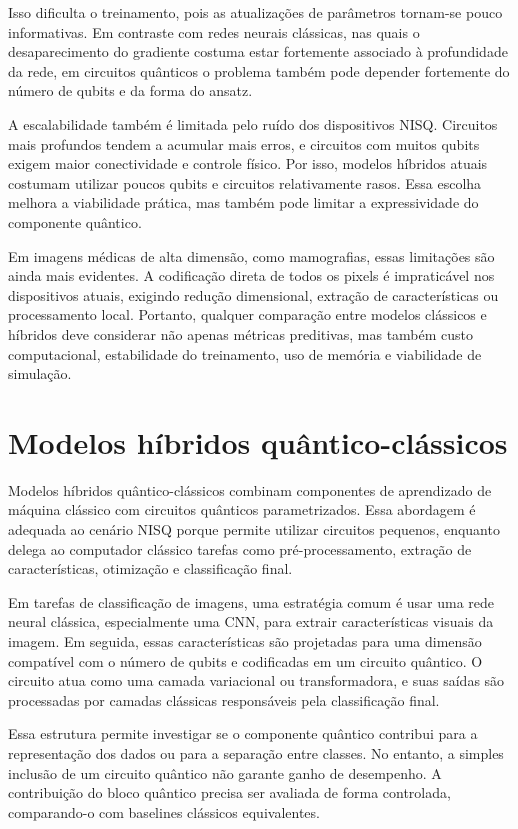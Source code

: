 \documentclass[
    12pt,
    openright,
    oneside,
    a4paper,
    english,
    brazil
]{abntex2}
\begin{document}
Isso dificulta o treinamento, pois as atualizações de parâmetros tornam-se pouco informativas. Em contraste com redes neurais clássicas, nas quais o desaparecimento do gradiente costuma estar fortemente associado à profundidade da rede, em circuitos quânticos o problema também pode depender fortemente do número de qubits e da forma do ansatz.

A escalabilidade também é limitada pelo ruído dos dispositivos NISQ. Circuitos mais profundos tendem a acumular mais erros, e circuitos com muitos qubits exigem maior conectividade e controle físico. Por isso, modelos híbridos atuais costumam utilizar poucos qubits e circuitos relativamente rasos. Essa escolha melhora a viabilidade prática, mas também pode limitar a expressividade do componente quântico.

Em imagens médicas de alta dimensão, como mamografias, essas limitações são ainda mais evidentes. A codificação direta de todos os pixels é impraticável nos dispositivos atuais, exigindo redução dimensional, extração de características ou processamento local. Portanto, qualquer comparação entre modelos clássicos e híbridos deve considerar não apenas métricas preditivas, mas também custo computacional, estabilidade do treinamento, uso de memória e viabilidade de simulação.


\section{Modelos híbridos quântico-clássicos}

Modelos híbridos quântico-clássicos combinam componentes de aprendizado de máquina clássico com circuitos quânticos parametrizados. Essa abordagem é adequada ao cenário NISQ porque permite utilizar circuitos pequenos, enquanto delega ao computador clássico tarefas como pré-processamento, extração de características, otimização e classificação final.

Em tarefas de classificação de imagens, uma estratégia comum é usar uma rede neural clássica, especialmente uma CNN, para extrair características visuais da imagem. Em seguida, essas características são projetadas para uma dimensão compatível com o número de qubits e codificadas em um circuito quântico. O circuito atua como uma camada variacional ou transformadora, e suas saídas são processadas por camadas clássicas responsáveis pela classificação final.

Essa estrutura permite investigar se o componente quântico contribui para a representação dos dados ou para a separação entre classes. No entanto, a simples inclusão de um circuito quântico não garante ganho de desempenho. A contribuição do bloco quântico precisa ser avaliada de forma controlada, comparando-o com baselines clássicos equivalentes.
\end{document}
